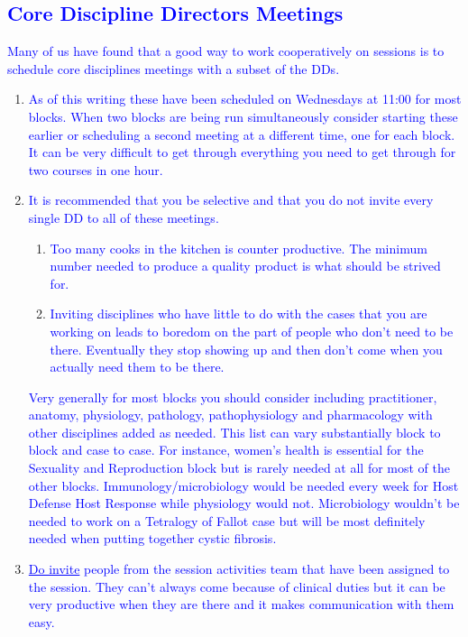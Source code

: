 \documentclass[11pt]{article}
\newcommand{\trsem}[1]{\textcolor{blue}{#1}}
\begin{document}
\subsection*{\trsem{Core Discipline Directors Meetings}}    
  \def\labelenumi{\trsem{\arabic{enumi}.}}
\trsem{Many of us have found that a good way to work cooperatively on sessions is to schedule core disciplines meetings with a subset of the DDs.}
\begin{enumerate}
\item \trsem{As of this writing these have been scheduled on
    Wednesdays at 11:00 for most blocks.  When two blocks are being
    run simultaneously consider starting these earlier or scheduling a
    second meeting at a different time, one for each block.  It can be
    very difficult to get through everything you need to get through
    for two courses in one hour.}
\item \trsem{It is recommended that you be selective and that you do not invite every single DD to all of these meetings.}
  \begin{enumerate}
          \def\labelenumii{\trsem{\alph{enumii}.}}
  \item \trsem{Too many cooks in the kitchen is counter productive.  The minimum number needed to produce a quality product is what should be strived for.}
  \item \trsem{Inviting disciplines who have little to do with the cases that you are working on leads to boredom on the part of people who don't need to be there.  Eventually they stop showing up and then don't come when you actually need them to be there.}
  \end{enumerate}
  \trsem{Very generally for most blocks you should consider including practitioner, anatomy, physiology, pathology, pathophysiology and pharmacology with other disciplines added as needed.  This list can vary substantially block to block and case to case.  For instance, women's health is essential for the Sexuality and Reproduction block but is rarely needed at all for most of the other blocks.  Immunology/microbiology would be needed every week for Host Defense Host Response while physiology would not.  Microbiology wouldn't be needed to work on a Tetralogy of Fallot case but will be most definitely needed when putting together cystic fibrosis.}
\item \trsem{\underline{Do invite} people from the session activities team that have been assigned to the session.  They can't always come because of clinical duties but it can be very productive when they are there and it makes communication with them easy.}

\end{enumerate}
\end{document}
